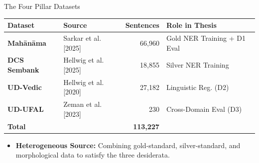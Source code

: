 \documentclass[10pt]{beamer}
\def\tpage{}
\newcommand{\tp}[1]{\def\tpage{#1}}
\begin{document}
\begin{frame}{The Four Pillar Datasets}
    \tp{9}
    \begin{table}
        \centering
        \small
        \begin{tabular}{llrl}
            \toprule
            \textbf{Dataset} & \textbf{Source} & \textbf{Sentences} & \textbf{Role in Thesis} \\
            \midrule
            \textbf{Mahānāma} & Sarkar et al. [2025] & 66,960 & Gold NER Training + D1 Eval \\
            \textbf{DCS Sembank} & Hellwig et al. [2025] & 18,855 & Silver NER Training \\
            \textbf{UD-Vedic} & Hellwig et al. [2020] & 27,182 & Linguistic Reg. (D2) \\
            \textbf{UD-UFAL} & Zeman et al. [2023] & 230 & Cross-Domain Eval (D3) \\
            \midrule
            \textbf{Total} & & \textbf{113,227} & \\
            \bottomrule
        \end{tabular}
    \end{table}
    \vfill
    \begin{itemize}
        \item \textbf{Heterogeneous Source:} Combining gold-standard, silver-standard, and morphological data to satisfy the three desiderata.
    \end{itemize}
\end{frame}
\end{document}
